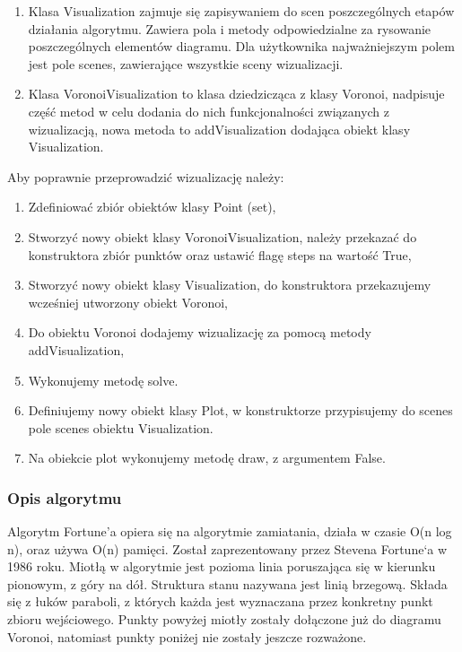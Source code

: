 \documentclass{article}
\begin{document}
\begin{enumerate}
    \item Klasa Visualization zajmuje się zapisywaniem do scen poszczególnych etapów działania algorytmu. Zawiera pola i metody odpowiedzialne za rysowanie poszczególnych elementów diagramu. Dla użytkownika najważniejszym polem jest pole scenes, zawierające wszystkie sceny wizualizacji.
    \item Klasa VoronoiVisualization to klasa dziedzicząca z klasy Voronoi, nadpisuje część metod w celu dodania do nich funkcjonalności związanych z wizualizacją, nowa metoda to addVisualization dodająca obiekt klasy Visualization.
\end{enumerate}
Aby poprawnie przeprowadzić wizualizację należy:
\begin{enumerate}
    \item Zdefiniować zbiór obiektów klasy Point (set),
    \item Stworzyć nowy obiekt klasy VoronoiVisualization, należy przekazać do konstruktora zbiór punktów oraz ustawić flagę steps na wartość True,
    \item Stworzyć nowy obiekt klasy Visualization, do konstruktora przekazujemy wcześniej utworzony obiekt Voronoi,
     \item Do obiektu Voronoi dodajemy wizualizację za pomocą metody addVisualization,
     \item Wykonujemy metodę solve.
    \item Definiujemy nowy obiekt klasy Plot, w konstruktorze przypisujemy do scenes pole scenes obiektu Visualization.
     \item Na obiekcie plot wykonujemy metodę draw, z argumentem False.

\end{enumerate}

\subsubsection{Opis algorytmu}
Algorytm Fortune’a opiera się na algorytmie zamiatania, działa w czasie O(n log n), oraz używa O(n) pamięci. Został zaprezentowany przez Stevena Fortune‘a w 1986 roku.
Miotłą w algorytmie jest pozioma linia poruszająca się w kierunku pionowym, z góry na dół.
Struktura stanu nazywana jest linią brzegową. Składa się z łuków paraboli, z których każda jest wyznaczana przez konkretny punkt zbioru wejściowego.
Punkty powyżej miotły zostały dołączone już do diagramu Voronoi, natomiast punkty poniżej nie zostały jeszcze rozważone.
\end{document}
